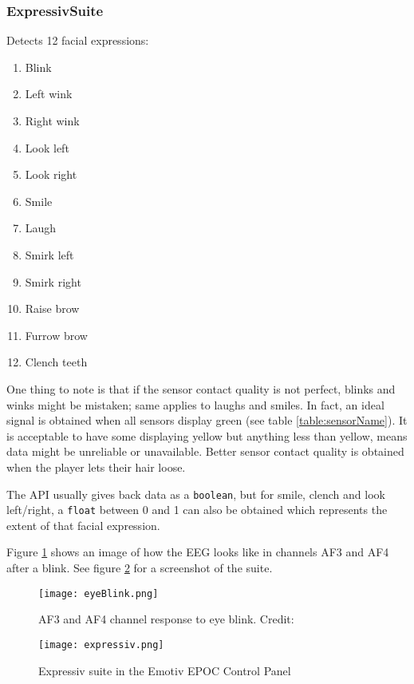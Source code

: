 \subsubsection{Expressiv\texttrademark  Suite}
Detects 12 facial expressions:
\begin{multicols}{2}
\begin{enumerate}
	\item Blink
	\item Left wink
	\item Right wink
	\item Look left
	\item Look right
	\item Smile
	\item Laugh
	\item Smirk left
	\item Smirk right
	\item Raise brow
	\item Furrow brow
	\item Clench teeth
\end{enumerate}
\end{multicols}
One thing to note is that if the sensor contact quality is not perfect, blinks and winks might be mistaken; same applies to laughs and smiles. In fact, an ideal signal is obtained when all sensors display green (see table \ref{table:sensorName}). It is acceptable to have some displaying yellow but anything less than yellow, means data might be unreliable or unavailable. Better sensor contact quality is obtained when the player lets their hair loose.
	
The API usually gives back data as a \texttt{boolean}, but for smile, clench and look left/right, a \texttt{float} between 0 and 1 can also be obtained which represents the extent of that facial expression. 

Figure \ref{fig:blinkAF} shows an image of how the EEG looks like in channels AF3 and AF4 after a blink. See figure \ref{fig:expressiv} for a screenshot of the suite.

\begin{figure}
  \centering
  \texttt{[image: eyeBlink.png]}
  \caption{AF3 and AF4 channel response to eye blink. Credit: \cite{experimenterEPOC}}
    \label{fig:blinkAF}           
\end{figure}

\begin{figure}
  \centering
  \texttt{[image: expressiv.png]}
  \caption{Expressiv suite in the Emotiv EPOC Control Panel}
    \label{fig:expressiv}           
\end{figure}

